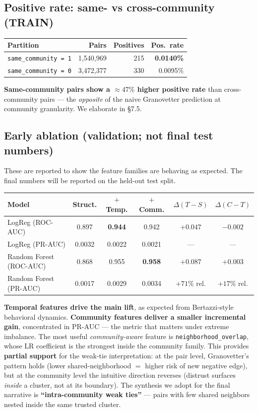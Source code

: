 \documentclass[11pt,a4paper]{article}
\newcommand{\code}[1]{\texttt{#1}}
\begin{document}
\subsection{Positive rate: same- vs cross-community (TRAIN)}
\begin{center}
\begin{tabular}{lrrr}
\toprule
Partition                & Pairs       & Positives & Pos.\ rate \\
\midrule
\code{same\_community = 1} & 1{,}540{,}969 & 215 & \textbf{0.0140\%} \\
\code{same\_community = 0} & 3{,}472{,}377 & 330 & 0.0095\% \\
\bottomrule
\end{tabular}
\end{center}
\textbf{Same-community pairs show a $\approx 47\%$ higher positive rate} than
cross-community pairs --- the \emph{opposite} of the naive Granovetter
prediction at community granularity. We elaborate in \S7.5.

\subsection{Early ablation (validation; not final test numbers)}
These are reported to show the feature families are behaving as expected.
The final numbers will be reported on the held-out test split.

\begin{center}
\small
\begin{tabular}{lccccc}
\toprule
Model & Struct. & $+$ Temp. & $+$ Comm. & $\Delta(T-S)$ & $\Delta(C-T)$ \\
\midrule
LogReg (ROC-AUC)        & 0.897  & \textbf{0.944} & 0.942 & $+0.047$   & $-0.002$        \\
LogReg (PR-AUC)         & 0.0032 & 0.0022         & 0.0021 & ---        & ---             \\
Random Forest (ROC-AUC) & 0.868  & 0.955          & \textbf{0.958} & $+0.087$   & $+0.003$    \\
Random Forest (PR-AUC)  & 0.0017 & 0.0029         & 0.0034 & $+71\%$ rel. & $+17\%$ rel. \\
\bottomrule
\end{tabular}
\end{center}

\textbf{Temporal features drive the main lift}, as expected from
Bertazzi-style behavioral dynamics. \textbf{Community features deliver a
smaller incremental gain}, concentrated in PR-AUC --- the metric that
matters under extreme imbalance. The most useful \emph{community-aware}
feature is \code{neighborhood\_overlap}, whose LR coefficient is the
strongest inside the community family. This provides \textbf{partial
support} for the weak-tie interpretation: at the pair level, Granovetter's
pattern holds (lower shared-neighborhood $=$ higher risk of new negative
edge), but at the community level the intuitive direction reverses (distrust
surfaces \emph{inside} a cluster, not at its boundary). The synthesis we
adopt for the final narrative is \textbf{``intra-community weak ties''} ---
pairs with few shared neighbors nested inside the same trusted cluster.
\end{document}
